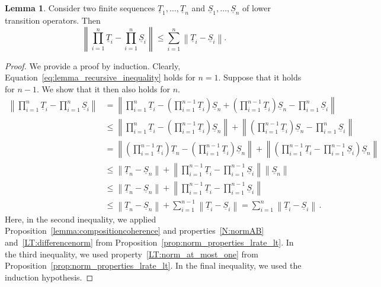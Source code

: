 \documentclass[10pt,a4paper]{paper}
\theoremstyle{definition}
\newtheorem{lemma}[theorem]{Lemma}
\newcommand{\norm}[1]{\left\lVert #1 \right\rVert}
\begin{document}
\begin{lemma}\label{lemma:recursive_lower_trans}
Consider two finite sequences $\underline{T}_1,\ldots,\underline{T}_n$ and $\underline{S}_1,\ldots,\underline{S}_n$ of lower transition operators. Then
\begin{equation}\label{eq:lemma_recursive_inequality}
\norm{\prod_{i=1}^n\underline{T}_i - \prod_{i=1}^n\underline{S}_i} \leq \sum_{i=1}^n \norm{\underline{T}_i - \underline{S}_i}.
\end{equation}
\end{lemma}
\begin{proof}
We provide a proof by induction. Clearly, Equation~\eqref{eq:lemma_recursive_inequality} holds for $n=1$. Suppose that it holds for $n-1$. We show that it then also holds for $n$.
\begin{align*}
\norm{\prod_{i=1}^n\underline{T}_i - \prod_{i=1}^n\underline{S}_i} &= \norm{\prod_{i=1}^n\underline{T}_i - \left(\prod_{i=1}^{n-1}\underline{T}_i\right)\underline{S}_n + \left(\prod_{i=1}^{n-1}\underline{T}_i\right)\underline{S}_n - \prod_{i=1}^n\underline{S}_i} \\
 &\leq \norm{\prod_{i=1}^n\underline{T}_i - \left(\prod_{i=1}^{n-1}\underline{T}_i\right)\underline{S}_n} + \norm{\left(\prod_{i=1}^{n-1}\underline{T}_i\right)\underline{S}_n - \prod_{i=1}^n\underline{S}_i} \\
 &= \norm{\left(\prod_{i=1}^{n-1}\underline{T}_i\right)\underline{T}_n - \left(\prod_{i=1}^{n-1}\underline{T}_i\right)\underline{S}_n} + \norm{\left(\prod_{i=1}^{n-1}\underline{T}_i - \prod_{i=1}^{n-1}\underline{S}_i\right)\underline{S}_n} \\
 &\leq \norm{\underline{T}_n - \underline{S}_n} + \norm{\prod_{i=1}^{n-1}\underline{T}_i - \prod_{i=1}^{n-1}\underline{S}_i}\norm{\underline{S}_n} \\
 &\leq \norm{\underline{T}_n - \underline{S}_n} + \norm{\prod_{i=1}^{n-1}\underline{T}_i - \prod_{i=1}^{n-1}\underline{S}_i} \\
 &\leq \norm{\underline{T}_n - \underline{S}_n} + \sum_{i=1}^{n-1}\norm{\underline{T}_i - \underline{S}_i} = \sum_{i=1}^{n}\norm{\underline{T}_i - \underline{S}_i}\,.
\end{align*}
Here, in the second inequality, we applied Proposition~\ref{lemma:compositioncoherence} and properties~\ref{N:normAB} and~\ref{LT:differencenorm} from Proposition~\ref{prop:norm_properties_lrate_lt}. In the third inequality, we used property~\ref{LT:norm_at_most_one} from Proposition~\ref{prop:norm_properties_lrate_lt}. In the final inequality, we used the induction hypothesis.
\end{proof}
\end{document}
